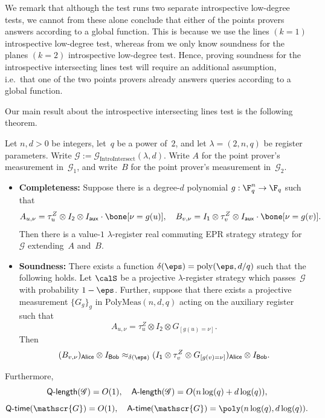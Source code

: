 \documentclass[11pt]{article}
\newcommand{\game}{\mathscr{G}}
\newcommand{\reg}[1]{{\mathsf{#1}}}
\newcommand{\qtime}[1]{\mathsf{Q}\textnormal{-}\mathsf{time}(#1)}
\newcommand{\atime}[1]{\mathsf{A}\textnormal{-}\mathsf{time}(#1)}
\newcommand{\qlength}[1]{\mathsf{Q}\textnormal{-}\mathsf{length}(#1)}
\newcommand{\alength}[1]{\mathsf{A}\textnormal{-}\mathsf{length}(#1)}
\begin{document}
\begin{remark}
We remark that although the test runs two separate introspective low-degree tests,
we cannot from these alone conclude that either of the points provers answers according to a global function.
This is because we use the lines $(k=1)$ introspective low-degree test,
whereas from  we only know soundness for the planes $(k=2)$ introspective low-degree test.
Hence, proving soundness for the introspective intersecting lines test will require an additional assumption,
i.e.\ that one of the two points provers already answers queries according to a global function.
\end{remark}

Our main result about the introspective intersecting lines test is the following theorem.

\begin{theorem}\label{thm:big-transfer}
Let $n, d> 0$ be integers, let~$q$ be a power of~$2$, and let $\lambda = (2, n, q)$ be register parameters.
Write $\game := \game_{\mathrm{IntroIntersect}}(\lambda, d)$.
Write $A$ for the point prover's measurement in~$\game_1$,
and write~$B$ for the point prover's measurement in~$\game_2$.
\begin{itemize}
\item[$\circ$] \textbf{Completeness:}
		Suppose there is a degree-$d$ polynomial $g:\F_q^{n}\rightarrow \F_q$ such that
		\begin{equation*}
			A_{u, \nu} = \tau_u^Z \otimes I_{\reg{2}} \otimes I_{\reg{aux}} \cdot \bone[\nu = g(u)],
			\quad
			B_{v, \nu} = I_{\reg{1}} \otimes \tau_v^Z \otimes I_{\reg{aux}} \cdot \bone[\nu = g(v)].
		\end{equation*}
		Then there is a value-$1$ $\lambda$-register real commuting EPR strategy strategy for $\game$
		extending~$A$ and~$B$.
\item[$\circ$] \textbf{Soundness:}
		There exists a function $\delta(\eps) = \mathrm{poly}(\eps, d/q)$ such that the following holds.
		Let $\calS$ be a projective $\lambda$-register strategy which passes~$\game$ with probability $1-\eps$.
		Further, suppose that there exists a projective measurement
		$\{G_g\}_g$ in $\mathrm{PolyMeas}(n, d, q)$ acting on the auxiliary register such that
		\begin{equation*}
		A_{u, \nu} = \tau_u^Z \otimes I_{\reg{2}} \otimes G_{[g(u)= \nu]}.
		\end{equation*}
		Then
		\begin{equation*}
		(B_{v, \nu})_{\reg{Alice}} \otimes I_{\reg{Bob}}
			\approx_{\delta(\eps)} (I_{\reg{1}} \otimes \tau_v^Z \otimes G_{[g(v)=\nu]} )_{\reg{Alice}}\otimes I_{\reg{Bob}}.
		\end{equation*}
\end{itemize}
Furthermore,
\begin{equation*}
\qlength{\game} = O(1), \quad
\alength{\game} = O(n \log(q) + d \log(q)),
\end{equation*}
\begin{equation*}
\qtime{\game} = O(1), \quad
\atime{\game} = \poly(n \log(q), d \log(q)).
\end{equation*}
\end{theorem}
\end{document}
